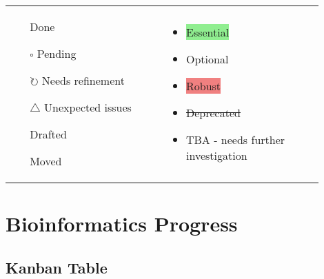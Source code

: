 \documentclass[11pt]{report}
\newcommand{\done}{\checkmark}
\newcommand{\pending}{$\square$}
\newcommand{\refine}{$\circlearrowright$}
\newcommand{\issue}{$\triangle$}
\newcommand{\draft}{\faPencil}
\newcommand{\moved}{\faArrowCircleRight}
\newcommand{\highlightessential}[1]{\colorbox{lightgreen}{#1}}
\newcommand{\highlightoptional}[1]{\colorbox{lightorange}{#1}}
\newcommand{\highlightrobust}[1]{\colorbox{lightcoral}{#1}}
\newcommand{\deprecated}[1]{\sout{#1}}
\begin{document}
\begin{tcolorbox}[title=Legend, coltitle=AntiqueWhite1]
	\begin{tabular}{p{0.45\linewidth} p{0.45\linewidth}}
		\begin{itemize}
			\item [\done] Done
			\item [\pending] Pending
			\item [\refine] Needs refinement
			\item [\issue] Unexpected issues
			\item [\draft] Drafted
			\item [\moved] Moved
		\end{itemize}
		&
		\begin{itemize}
			\item \highlightessential{Essential}
			\item \highlightoptional{Optional}
			\item \highlightrobust{Robust}
			\item \deprecated{Deprecated}
			\item TBA - needs further investigation
		\end{itemize}
	\end{tabular}
\end{tcolorbox}	



\newpage
		
\chapter{Bioinformatics Progress}

\section{Kanban Table}
\end{document}
